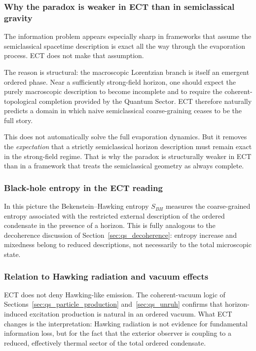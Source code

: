 \documentclass[11pt,a4paper]{article}
\numberwithin{equation}{section}
\begin{document}
\subsubsection*{Why the paradox is weaker in ECT than in semiclassical gravity}

The information problem appears especially sharp in frameworks that assume
the semiclassical spacetime description is exact all the way through the
evaporation process.
ECT does not make that assumption.

The reason is structural: the macroscopic Lorentzian branch is itself an
emergent ordered phase.
Near a sufficiently strong-field horizon, one should expect the purely
macroscopic description to become incomplete and to require the
coherent-topological completion provided by the Quantum Sector.
ECT therefore naturally predicts a domain in which naive semiclassical
coarse-graining ceases to be the full story.

This does not automatically solve the full evaporation dynamics.
But it removes the \emph{expectation} that a strictly semiclassical
horizon description must remain exact in the strong-field regime.
That is why the paradox is structurally weaker in ECT than in a framework
that treats the semiclassical geometry as always complete.

\subsubsection*{Black-hole entropy in the ECT reading}

In this picture the Bekenstein--Hawking entropy $S_{BH}$ measures the
coarse-grained entropy associated with the restricted external
description of the ordered condensate in the presence of a horizon.
This is fully analogous to the decoherence discussion
of Section~\ref{sec:qs_decoherence}: entropy increase and mixedness
belong to reduced descriptions, not necessarily to the total
microscopic state.

\subsubsection*{Relation to Hawking radiation and vacuum effects}

ECT does not deny Hawking-like emission.
The coherent-vacuum logic of Sections~\ref{sec:qs_particle_production}
and~\ref{sec:qs_unruh} confirms that horizon-induced excitation
production is natural in an ordered vacuum.
What ECT changes is the interpretation: Hawking radiation is not
evidence for fundamental information loss, but for the fact that the
exterior observer is coupling to a reduced, effectively thermal sector
of the total ordered condensate.
\end{document}
